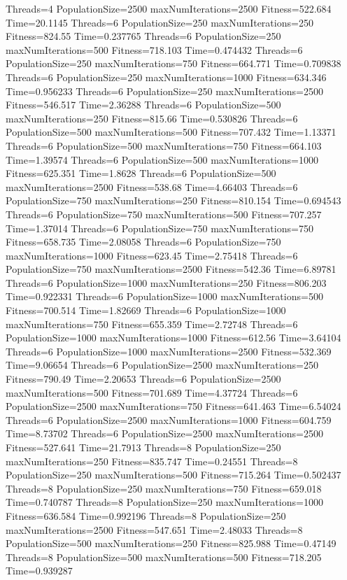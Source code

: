 \documentclass[10pt,letterpaper]{article}
\begin{document}
Threads=4 PopulationSize=2500 maxNumIterations=2500 Fitness=522.684 Time=20.1145
Threads=6 PopulationSize=250 maxNumIterations=250 Fitness=824.55 Time=0.237765
Threads=6 PopulationSize=250 maxNumIterations=500 Fitness=718.103 Time=0.474432
Threads=6 PopulationSize=250 maxNumIterations=750 Fitness=664.771 Time=0.709838
Threads=6 PopulationSize=250 maxNumIterations=1000 Fitness=634.346 Time=0.956233
Threads=6 PopulationSize=250 maxNumIterations=2500 Fitness=546.517 Time=2.36288
Threads=6 PopulationSize=500 maxNumIterations=250 Fitness=815.66 Time=0.530826
Threads=6 PopulationSize=500 maxNumIterations=500 Fitness=707.432 Time=1.13371
Threads=6 PopulationSize=500 maxNumIterations=750 Fitness=664.103 Time=1.39574
Threads=6 PopulationSize=500 maxNumIterations=1000 Fitness=625.351 Time=1.8628
Threads=6 PopulationSize=500 maxNumIterations=2500 Fitness=538.68 Time=4.66403
Threads=6 PopulationSize=750 maxNumIterations=250 Fitness=810.154 Time=0.694543
Threads=6 PopulationSize=750 maxNumIterations=500 Fitness=707.257 Time=1.37014
Threads=6 PopulationSize=750 maxNumIterations=750 Fitness=658.735 Time=2.08058
Threads=6 PopulationSize=750 maxNumIterations=1000 Fitness=623.45 Time=2.75418
Threads=6 PopulationSize=750 maxNumIterations=2500 Fitness=542.36 Time=6.89781
Threads=6 PopulationSize=1000 maxNumIterations=250 Fitness=806.203 Time=0.922331
Threads=6 PopulationSize=1000 maxNumIterations=500 Fitness=700.514 Time=1.82669
Threads=6 PopulationSize=1000 maxNumIterations=750 Fitness=655.359 Time=2.72748
Threads=6 PopulationSize=1000 maxNumIterations=1000 Fitness=612.56 Time=3.64104
Threads=6 PopulationSize=1000 maxNumIterations=2500 Fitness=532.369 Time=9.06654
Threads=6 PopulationSize=2500 maxNumIterations=250 Fitness=790.49 Time=2.20653
Threads=6 PopulationSize=2500 maxNumIterations=500 Fitness=701.689 Time=4.37724
Threads=6 PopulationSize=2500 maxNumIterations=750 Fitness=641.463 Time=6.54024
Threads=6 PopulationSize=2500 maxNumIterations=1000 Fitness=604.759 Time=8.73702
Threads=6 PopulationSize=2500 maxNumIterations=2500 Fitness=527.641 Time=21.7913
Threads=8 PopulationSize=250 maxNumIterations=250 Fitness=835.747 Time=0.24551
Threads=8 PopulationSize=250 maxNumIterations=500 Fitness=715.264 Time=0.502437
Threads=8 PopulationSize=250 maxNumIterations=750 Fitness=659.018 Time=0.740787
Threads=8 PopulationSize=250 maxNumIterations=1000 Fitness=636.584 Time=0.992196
Threads=8 PopulationSize=250 maxNumIterations=2500 Fitness=547.651 Time=2.48033
Threads=8 PopulationSize=500 maxNumIterations=250 Fitness=825.988 Time=0.47149
Threads=8 PopulationSize=500 maxNumIterations=500 Fitness=718.205 Time=0.939287
\end{document}
